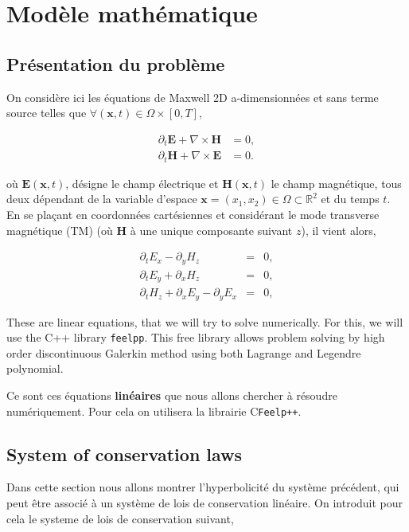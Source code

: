 \documentclass[a4paper,oneside,10pt]{report}
\begin{document}
\chapter{Modèle mathématique}
\section{Présentation du problème}
On considère ici les équations de Maxwell 2D a-dimensionnées et sans terme source telles que $\forall (\mathbf{x},t) \in \Omega \times [0,T]$,


\begin{equation}
\begin{aligned}
\label{eq:1}
\partial_t \mathbf{E} + \nabla \times \mathbf{H} &= 0,\\
\partial_t \mathbf{H} + \nabla \times \mathbf{E} &= 0.
\end{aligned}
\end{equation}

où $\mathbf{E}(\mathbf{x},t)$, désigne le champ électrique et $\mathbf{H}(\mathbf{x},t)$ le champ magnétique, tous deux dépendant de la variable d'espace $\mathbf{x}=(x_1,x_2)\in \Omega \subset \mathbb{R}^2$ et du temps $t$.\\


En se plaçant en coordonnées cartésiennes et considérant le mode transverse magnétique (TM) (où $\mathbf{H}$ à une unique composante suivant $z$), il vient alors,

\begin{eqnarray}
\partial_t E_x - \partial_y H_z  &=& 0, \label{eq:2a}\\
\partial_t E_y + \partial_x H_z &=& 0, \label{eq:2b}\\
\partial_t H_z + \partial_x E_y - \partial_y E_x &=& 0, \label{eq:2c}
\end{eqnarray}

These are linear equations, that we will try to solve numerically. For this, we will use the C++ library \texttt{feelpp}. This free library allows problem solving by high order discontinuous Galerkin method using both Lagrange and Legendre polynomial.


Ce sont ces équations \textbf{linéaires} que nous allons chercher à résoudre numériquement. Pour cela on utilisera la librairie C\texttt{Feelp++}.

\section{System of conservation laws}
Dans cette section nous allons montrer l'hyperbolicité du système précédent, qui peut être associé à un système de lois de conservation linéaire. On introduit pour cela le systeme de lois de conservation suivant,
\end{document}
